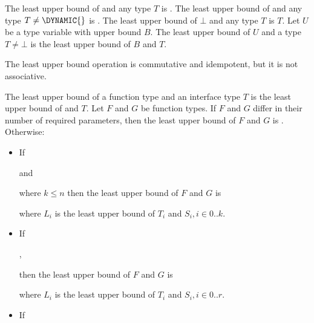 \documentclass[makeidx]{article}
\begin{document}
{\LMHash{}%
The least upper bound of \DYNAMIC{} and any type $T$ is \DYNAMIC.
The least upper bound of \VOID{} and any type $T \ne \DYNAMIC{}$ is \VOID.
The least upper bound of $\bot$ and any type $T$ is $T$.
Let $U$ be a type variable with upper bound $B$.
The least upper bound of $U$ and a type $T \ne \bot$ is
the least upper bound of $B$ and $T$.

\LMHash{}%
The least upper bound operation is commutative and idempotent,
but it is not associative.



\LMHash{}%
The least upper bound of a function type and an interface type $T$ is
the least upper bound of \FUNCTION{} and $T$.
Let $F$ and $G$ be function types.
If $F$ and $G$ differ in their number of required parameters,
then the least upper bound of $F$ and $G$ is \FUNCTION.
Otherwise:

\begin{itemize}
\item If

\noindent
{} and

\noindent
{}

\noindent
where $k \le n$ then the least upper bound of $F$ and $G$ is

\noindent
{}

\noindent
where $L_i$ is the least upper bound of $T_i$ and $S_i, i \in 0 .. k$.
\item If

\noindent
{},

\noindent
{}

\noindent
then the least upper bound of $F$ and $G$ is

\noindent
{}

\noindent
where $L_i$ is the least upper bound of $T_i$ and $S_i, i \in 0 .. r$.
\item If


\end{itemize}}
\end{document}
